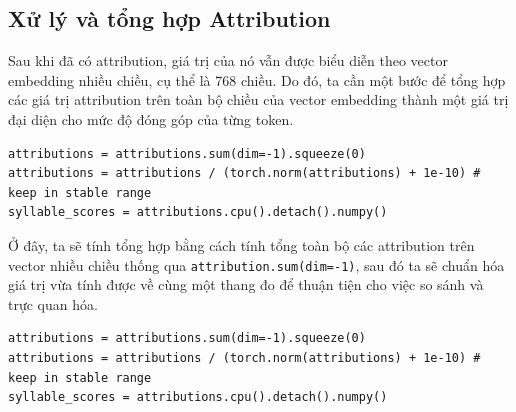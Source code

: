 \subsection{Xử lý và tổng hợp Attribution}
Sau khi đã có attribution, giá trị của nó vẫn được biểu diễn theo vector embedding nhiều chiều, cụ thể là 768 chiều. Do đó, ta cần một bước để tổng hợp các giá trị attribution trên toàn bộ chiều của vector embedding thành một giá trị 
đại diện cho mức độ đóng góp của từng token.

\begin{lstlisting}[style=pythoncode]
attributions = attributions.sum(dim=-1).squeeze(0)
attributions = attributions / (torch.norm(attributions) + 1e-10) # keep in stable range
syllable_scores = attributions.cpu().detach().numpy()
\end{lstlisting}

Ở đây, ta sẽ tính tổng hợp bằng cách tính tổng toàn bộ các attribution trên vector nhiều chiều thống qua \texttt{attribution.sum(dim=-1)}, sau đó ta sẽ chuẩn hóa giá trị vừa tính được về cùng một thang đo để thuận tiện cho việc so sánh và
trực quan hóa.

\begin{lstlisting}[style=pythoncode]
attributions = attributions.sum(dim=-1).squeeze(0)
attributions = attributions / (torch.norm(attributions) + 1e-10) # keep in stable range
syllable_scores = attributions.cpu().detach().numpy()
\end{lstlisting}


